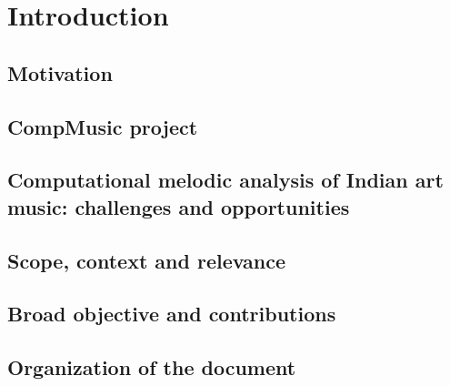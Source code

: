 
\chapter{Introduction}\label{chap:intro}

\section{Motivation}\label{sec:motivation}

\section{CompMusic project}\label{sec:definitions}

\section{Computational melodic analysis of Indian art music: challenges and opportunities}\label{sec:challenges_oppurtunities}

\section{Scope, context and relevance}\label{sec:scope_context_relevance}

\section{Broad objective and contributions}\label{sec:objective_contributions}

\section{Organization of the document}\label{sec:organization}
